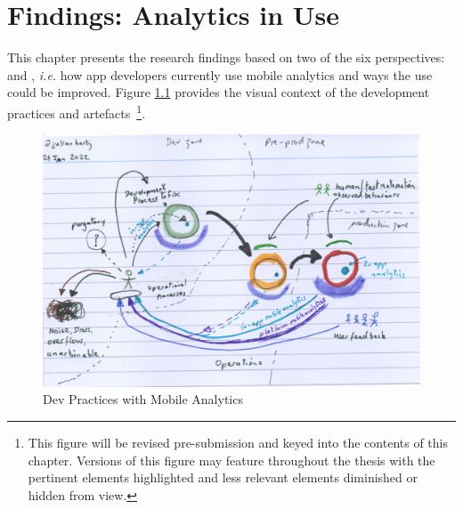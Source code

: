 \setchapterpreamble[u]{\margintoc}
\chapter{Findings: Analytics in Use}

This chapter presents the research findings based on two of the six perspectives: \uuse and \iuse, \emph{i.e.} how app developers currently use mobile analytics and ways the use could be improved. Figure \ref{fig:dev-practices-with-mobile-analytics} provides the visual context of the development practices and artefacts~\footnote{This figure will be revised pre-submission and keyed into the contents of this chapter. Versions of this figure may feature throughout the thesis with the pertinent elements highlighted and less relevant elements diminished or hidden from view.}.

\begin{figure}
    \centering
    \includegraphics[width=\linewidth]{images/rough-sketches/dev-practices-with-mobile-analytics-24-jan-2022.jpeg}
    \caption{Dev Practices with Mobile Analytics}
    \label{fig:dev-practices-with-mobile-analytics}
\end{figure}


